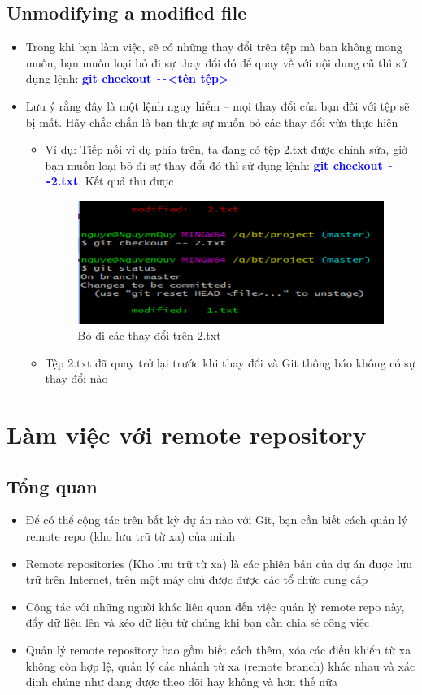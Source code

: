 \documentclass[12pt,a4paper]{report}
\begin{document}
\subsection{Unmodifying a modified file}
\begin{itemize}
\item Trong khi bạn làm việc, sẽ có những thay đổi trên tệp mà bạn không mong muốn, bạn muốn loại bỏ đi sự thay đổi đó để quay về với nội dung cũ thì sử dụng lệnh: \textcolor{blue}{\bf git checkout \texttt{-{}-}<tên tệp>}
\item Lưu ý rằng đây là một lệnh nguy hiểm – mọi thay đổi của bạn đối với tệp sẽ bị mất. Hãy chắc chắn là bạn thực sự muốn bỏ các thay đổi vừa thực hiện
	\begin{itemize}
\item Ví dụ: Tiếp nối ví dụ phía trên, ta đang có tệp 2.txt được chỉnh sửa, giờ bạn muốn loại bỏ đi sự thay đổi đó thì sử dụng lệnh: \textcolor{blue}{\bf git checkout \texttt{-{}-}2.txt}. Kết quả thu được

\begin{figure}[!ht]
	\centering
	\includegraphics[width=0.8\linewidth]{screenshot031}
\caption{Bỏ đi các thay đổi trên 2.txt}
	\label{fig:screenshot031}
	\end{figure}

\item Tệp 2.txt đã quay trở lại trước khi thay đổi và Git thông báo không có sự thay đổi nào
\end{itemize}\end{itemize}

\section{Làm việc với remote repository}
\subsection{Tổng quan} 
\begin{itemize}
\item Để có thể cộng tác trên bất kỳ dự án nào với Git, bạn cần biết cách quản lý remote repo (kho lưu trữ từ xa) của mình
\item Remote repositories (Kho lưu trữ từ xa) là các phiên bản của dự án được lưu trữ trên Internet,  trên một máy chủ được được các tổ chức cung cấp
\item Cộng tác với những người khác liên quan đến việc quản lý remote repo này, đẩy dữ liệu lên và kéo dữ liệu  từ chúng khi bạn cần chia sẻ công việc
\item Quản lý remote repository bao gồm biết cách thêm, xóa các điều khiển từ xa không còn hợp lệ, quản lý các nhánh từ xa (remote branch) khác nhau và xác định chúng như đang được theo dõi hay không và hơn thế nữa
\end{itemize}
\end{document}
